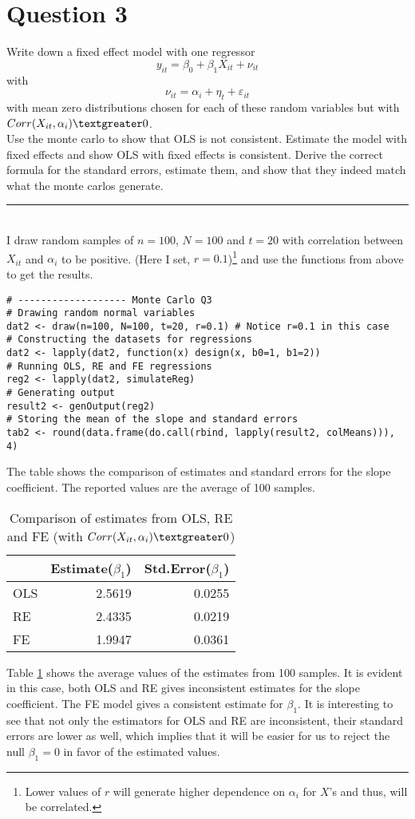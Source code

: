 \documentclass{article}
\newcommand{\floatintro}[1]{
  
  \vspace*{0.1in}
  
  {\footnotesize

    #1
    
  }
  
  \vspace*{0.1in} } \newcommand{\myrule}{\noindent\rule{16cm}{0.5pt}}
\begin{document}
\section*{Question 3}
Write down a fixed effect model with one regressor
\begin{equation}
  \label{eq:3}
  y_{it} = \beta_0 + \beta_1 X_{it} + \nu_{it}
\end{equation}
with
\begin{equation}
  \label{eq:4}
  \nu_{it} = \alpha_i + \eta_t + \varepsilon_{it}
\end{equation}
with mean zero distributions chosen for each of these random variables
but with $Corr(X_{it}, \alpha_i)\textgreater0$. \\
Use the monte carlo to show that OLS is not consistent. Estimate the
model with fixed effects and show OLS with fixed effects is
consistent. Derive the correct formula for the standard errors,
estimate them, and show that they indeed match what the monte carlos
generate. \\\myrule\\
I draw random samples of $n=100$, $N=100$ and $t=20$ with correlation
between $X_{it}$ and $\alpha_i$ to be positive. (Here I set,
$r=0.1$)\footnote{Lower values of $r$ will generate higher dependence
  on $\alpha_i$ for $X$'s and thus, will be correlated.} and use the
functions from above to get the results.
\begin{verbatim}
# ------------------- Monte Carlo Q3
# Drawing random normal variables
dat2 <- draw(n=100, N=100, t=20, r=0.1) # Notice r=0.1 in this case
# Constructing the datasets for regressions
dat2 <- lapply(dat2, function(x) design(x, b0=1, b1=2))
# Running OLS, RE and FE regressions
reg2 <- lapply(dat2, simulateReg)
# Generating output
result2 <- genOutput(reg2)
# Storing the mean of the slope and standard errors
tab2 <- round(data.frame(do.call(rbind, lapply(result2, colMeans))), 4)
\end{verbatim}

\begin{table}[ht]
  \floatintro{The table shows the comparison of estimates and standard
    errors for the slope coefficient. The reported values are the
    average of 100 samples.}
  \centering
  \begin{tabular}{lrr}
    \hline
    & Estimate($\beta_1$) & Std.Error($\beta_1$) \\ 
    \hline
    OLS & 2.5619 & 0.0255 \\ 
    RE & 2.4335 & 0.0219 \\ 
    FE & 1.9947 & 0.0361 \\ 
    \hline
  \end{tabular}
  \caption{Comparison of estimates from OLS, RE and FE (with
    $Corr(X_{it}, \alpha_i)\textgreater0$)}
  \label{tab:q3}
\end{table}
Table \ref{tab:q3} shows the average values of the estimates from 100
samples. It is evident in this case, both OLS and RE gives
inconsistent estimates for the slope coefficient. The FE model gives
a consistent estimate for $\beta_1$. It is interesting to see that not
only the estimators for OLS and RE are inconsistent, their standard errors are lower as
well, which implies that it will be easier for us to reject the null $\beta_1=0$
in favor of the estimated values.
\end{document}
